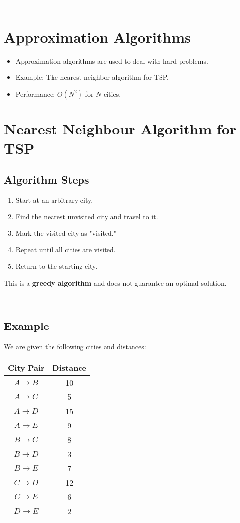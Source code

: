 \documentclass[a4paper,12pt]{article}
\begin{document}
---

\section*{Approximation Algorithms}

\begin{itemize}[label=$\bullet$]
    \item Approximation algorithms are used to deal with hard problems.
    \item Example: The nearest neighbor algorithm for TSP.
    \item Performance: \(O(N^2)\) for \(N\) cities.
\end{itemize}

\section*{Nearest Neighbour Algorithm for TSP}

\subsection*{Algorithm Steps}

\begin{enumerate}
    \item Start at an arbitrary city.
    \item Find the nearest unvisited city and travel to it.
    \item Mark the visited city as "visited."
    \item Repeat until all cities are visited.
    \item Return to the starting city.
\end{enumerate}

This is a \textbf{greedy algorithm} and does not guarantee an optimal solution.

---

\subsection*{Example}

We are given the following cities and distances:

\begin{center}
\begin{tabular}{cc}
    \toprule
    \textbf{City Pair} & \textbf{Distance} \\
    \midrule
    \( A \to B \) & 10 \\
    \( A \to C \) & 5 \\
    \( A \to D \) & 15 \\
    \( A \to E \) & 9 \\
    \( B \to C \) & 8 \\
    \( B \to D \) & 3 \\
    \( B \to E \) & 7 \\
    \( C \to D \) & 12 \\
    \( C \to E \) & 6 \\
    \( D \to E \) & 2 \\
    \bottomrule
\end{tabular}
\end{center}
\end{document}
